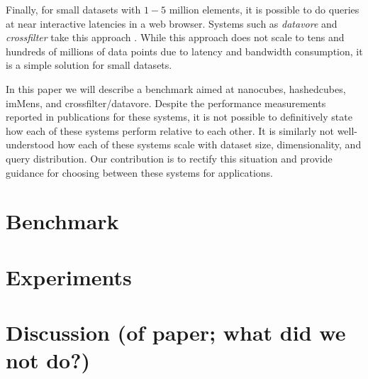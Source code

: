 \documentclass[journal]{vgtc}                %
\begin{document}
Finally, for small datasets with $1-5$ million elements, it is possible to do
queries at near interactive latencies in a web browser. Systems such as
\textit{datavore} and \textit{crossfilter} take this approach
\cite{crossfilter,datavore}. While this approach does not scale to tens and
hundreds of millions of data points due to latency and bandwidth consumption,
it is a simple solution for small datasets. 

In this paper we will describe a benchmark aimed at nanocubes, hashedcubes,
imMens, and crossfilter/datavore. Despite the performance measurements reported
in publications for these systems, it is not possible to definitively state how
each of these systems perform relative to each other. It is similarly not
well-understood how each of these systems scale with dataset size,
dimensionality, and query distribution. Our contribution is to rectify this
situation and provide guidance for choosing between these systems for
applications.




\section{Benchmark}





\section{Experiments}




\section{Discussion (of paper; what did we not do?)}
\end{document}
